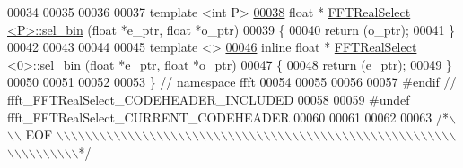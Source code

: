\begin{DoxyCode}
00034 
00035 
00036 
00037 \textcolor{keyword}{template} <\textcolor{keywordtype}{int} P>
\hypertarget{a00105_source_l00038}{}\hyperlink{a00015_a6659db9f9be1816f182d1c5988cd3859}{00038} \textcolor{keywordtype}{float} * \hyperlink{a00015}{FFTRealSelect <P>::sel\_bin} (\textcolor{keywordtype}{float} *e\_ptr, \textcolor{keywordtype}{float} *o\_ptr)
00039 \{
00040     \textcolor{keywordflow}{return} (o\_ptr);
00041 \}
00042 
00043 
00044 
00045 \textcolor{keyword}{template} <>
\hypertarget{a00105_source_l00046}{}\hyperlink{a00015_a29de94bf4932f6ba723aae1138afabbb}{00046} \textcolor{keyword}{inline} \textcolor{keywordtype}{float} *  \hyperlink{a00015}{FFTRealSelect <0>::sel\_bin} (\textcolor{keywordtype}{float} *e\_ptr, \textcolor{keywordtype}{float} *o\_ptr)
00047 \{
00048     \textcolor{keywordflow}{return} (e\_ptr);
00049 \}
00050 
00051 
00052 
00053 \}   \textcolor{comment}{// namespace ffft}
00054 
00055 
00056 
00057 \textcolor{preprocessor}{#endif  // ffft\_FFTRealSelect\_CODEHEADER\_INCLUDED}
00058 
00059 \textcolor{preprocessor}{#undef ffft\_FFTRealSelect\_CURRENT\_CODEHEADER}
00060 
00061 
00062 
00063 \textcolor{comment}{/*\(\backslash\)\(\backslash\)\(\backslash\) EOF \(\backslash\)\(\backslash\)\(\backslash\)\(\backslash\)\(\backslash\)\(\backslash\)\(\backslash\)\(\backslash\)\(\backslash\)\(\backslash\)\(\backslash\)\(\backslash\)\(\backslash\)\(\backslash\)\(\backslash\)\(\backslash\)\(\backslash\)\(\backslash\)\(\backslash\)\(\backslash\)\(\backslash\)\(\backslash\)\(\backslash\)\(\backslash\)\(\backslash\)\(\backslash\)\(\backslash\)\(\backslash\)\(\backslash\)\(\backslash\)\(\backslash\)\(\backslash\)\(\backslash\)\(\backslash\)\(\backslash\)\(\backslash\)\(\backslash\)\(\backslash\)\(\backslash\)\(\backslash\)\(\backslash\)\(\backslash\)\(\backslash\)\(\backslash\)\(\backslash\)\(\backslash\)\(\backslash\)\(\backslash\)\(\backslash\)\(\backslash\)\(\backslash\)\(\backslash\)\(\backslash\)\(\backslash\)\(\backslash\)\(\backslash\)\(\backslash\)\(\backslash\)\(\backslash\)\(\backslash\)\(\backslash\)\(\backslash\)\(\backslash\)\(\backslash\)\(\backslash\)\(\backslash\)*/}
\end{DoxyCode}
